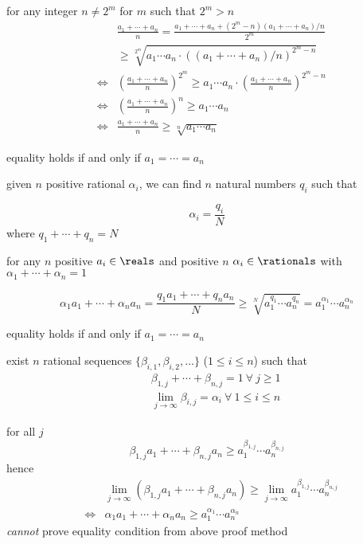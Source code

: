 \documentclass[17pt,landscape]{foils}
\begin{document}
{\bit
	\item for any integer $n\neq 2^m$
	\vitem for $m$ such that $2^m>n$
		\begin{eqnarray*}
		&&
			\frac{a_1+\cdots+a_n}{n} = \frac{a_1 + \cdots + a_n + (2^m-n) (a_1+\cdots+a_n) /n}{2^m}
		\\
		&&
			\geq
			\sqrt[2^m]{a_1\cdots a_n \cdot ((a_1 + \cdots + a_n)/n)^{2^m-n}}
		\\
		&\Leftrightarrow&
			\left(\frac{a_1+\cdots+a_n}{n}\right)^{2^m}
			\geq
			{a_1\cdots a_n \cdot \left(\frac{a_1 + \cdots + a_n}{n}\right)^{2^m-n}}
		\\
		&\Leftrightarrow&
			\left(\frac{a_1+\cdots+a_n}{n}\right)^{n}
			\geq
			{a_1\cdots a_n}
		\\
		&\Leftrightarrow&
			\frac{a_1+\cdots+a_n}{n}
			\geq
			\sqrt[n]{a_1\cdots a_n}
		\end{eqnarray*}
		\bit
			\item equality holds if and only if $a_1=\cdots=a_n$
		\eit
\eit



\bit
\item
	given $n$ positive rational $\alpha_i$,
	we can find $n$ natural numbers $q_i$
	such that

	\[
		\alpha_i = \frac{q_i}{ N}
	\]
	where $q_1+\cdots+q_n=N$

\vitem
	for any $n$ positive $a_i\in\reals$ and positive $n$ $\alpha_i\in\rationals$ with $\alpha_1+\cdots+\alpha_n=1$

		\[
			\alpha_1 a_1 + \cdots + \alpha_n a_n
			= \frac{q_1 a_1 + \cdots + q_n a_n}{N}
			\geq \sqrt[N]{a_1^{q_1}\cdots a_n^{q_n}}
			= a_1^{\alpha_1}\cdots a_n^{\alpha_n}
		\]

	\bit
	\item
		equality holds if and only if $a_1=\cdots=a_n$
	\eit
\eit



\bit
\item
	exist $n$ rational sequences $\{ \beta_{i,1}, \beta_{i,2}, \ldots\}$ ($1\leq i\leq n$) such that
	\begin{eqnarray*}
		&&
			\beta_{1,j}+\cdots+\beta_{n,j}=1 \ \forall \ j\geq1
		\\
		&&
			\lim_{j\to\infty} \beta_{i,j} = \alpha_i \ \forall \ 1\leq i\leq n
	\end{eqnarray*}

\vitem
	for all $j$
	\[
		\beta_{1,j} a_1 + \cdots + \beta_{n,j} a_n
			\geq
		a_1^{\beta_{1,j}}\cdots a_n^{\beta_{n,j}}
	\]
	hence
		\begin{eqnarray*}
		&&
			\lim_{j\to\infty} \left(\beta_{1,j} a_1 + \cdots + \beta_{n,j} a_n \right)
				\geq
			\lim_{j\to\infty} a_1^{\beta_{1,j}}\cdots a_n^{\beta_{n,j}}
		\\
		&\Leftrightarrow&
			\alpha_1 a_1 + \cdots + \alpha_n a_n
				\geq
			a_1^{\alpha_1}\cdots a_n^{\alpha_n}
		\end{eqnarray*}
	\vitem \emph{cannot} prove equality condition from above proof method
\eit


}
\end{document}
